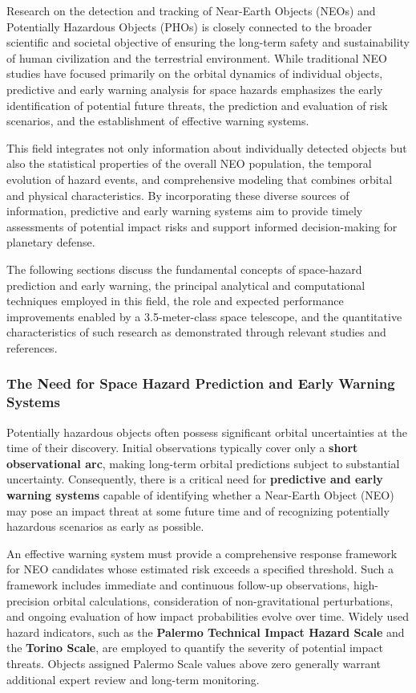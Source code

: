 Research on the detection and tracking of Near-Earth Objects (NEOs) and Potentially Hazardous Objects (PHOs) is closely connected to the broader scientific and societal objective of ensuring the long-term safety and sustainability of human civilization and the terrestrial environment. While traditional NEO studies have focused primarily on the orbital dynamics of individual objects, predictive and early warning analysis for space hazards emphasizes the early identification of potential future threats, the prediction and evaluation of risk scenarios, and the establishment of effective warning systems.

This field integrates not only information about individually detected objects but also the statistical properties of the overall NEO population, the temporal evolution of hazard events, and comprehensive modeling that combines orbital and physical characteristics. By incorporating these diverse sources of information, predictive and early warning systems aim to provide timely assessments of potential impact risks and support informed decision-making for planetary defense.

The following sections discuss the fundamental concepts of space-hazard prediction and early warning, the principal analytical and computational techniques employed in this field, the role and expected performance improvements enabled by a 3.5-meter-class space telescope, and the quantitative characteristics of such research as demonstrated through relevant studies and references.

\subsubsection{The Need for Space Hazard Prediction and Early Warning Systems}

Potentially hazardous objects often possess significant orbital uncertainties at the time of their discovery. Initial observations typically cover only a \textbf{short observational arc}, making long-term orbital predictions subject to substantial uncertainty. Consequently, there is a critical need for \textbf{predictive and early warning systems} capable of identifying whether a Near-Earth Object (NEO) may pose an impact threat at some future time and of recognizing potentially hazardous scenarios as early as possible.

An effective warning system must provide a comprehensive response framework for NEO candidates whose estimated risk exceeds a specified threshold. Such a framework includes immediate and continuous follow-up observations, high-precision orbital calculations, consideration of non-gravitational perturbations, and ongoing evaluation of how impact probabilities evolve over time. Widely used hazard indicators, such as the \textbf{Palermo Technical Impact Hazard Scale} and the \textbf{Torino Scale}, are employed to quantify the severity of potential impact threats. Objects assigned Palermo Scale values above zero generally warrant additional expert review and long-term monitoring.

